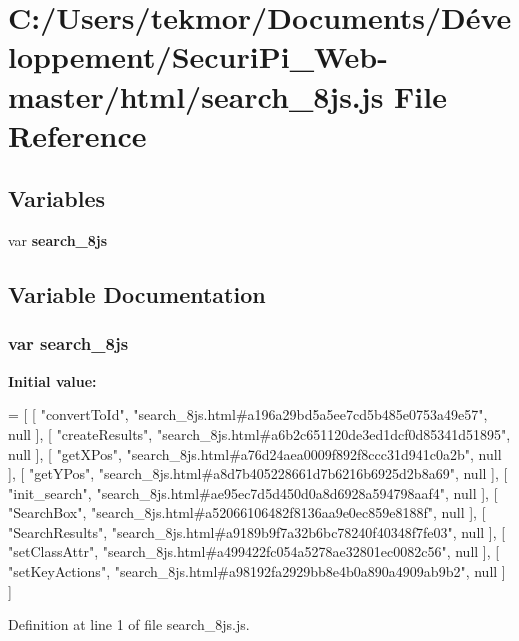 \section{C\+:/\+Users/tekmor/\+Documents/\+Développement/\+Securi\+Pi\+\_\+\+Web-\/master/html/search\+\_\+8js.js File Reference}
\label{search__8js_8js}
\subsection*{Variables}
\begin{DoxyCompactItemize}
\item 
var {\bf search\+\_\+8js}
\end{DoxyCompactItemize}


\subsection{Variable Documentation}
\subsubsection[{search\+\_\+8js}]{\setlength{\rightskip}{0pt plus 5cm}var search\+\_\+8js}\label{search__8js_8js_a768d43704726645088adec5847ceee70}
{\bfseries Initial value\+:}
\begin{DoxyCode}
=
[
    [ \textcolor{stringliteral}{"convertToId"}, \textcolor{stringliteral}{"search\_8js.html#a196a29bd5a5ee7cd5b485e0753a49e57"}, null ],
    [ \textcolor{stringliteral}{"createResults"}, \textcolor{stringliteral}{"search\_8js.html#a6b2c651120de3ed1dcf0d85341d51895"}, null ],
    [ \textcolor{stringliteral}{"getXPos"}, \textcolor{stringliteral}{"search\_8js.html#a76d24aea0009f892f8ccc31d941c0a2b"}, null ],
    [ \textcolor{stringliteral}{"getYPos"}, \textcolor{stringliteral}{"search\_8js.html#a8d7b405228661d7b6216b6925d2b8a69"}, null ],
    [ \textcolor{stringliteral}{"init\_search"}, \textcolor{stringliteral}{"search\_8js.html#ae95ec7d5d450d0a8d6928a594798aaf4"}, null ],
    [ \textcolor{stringliteral}{"SearchBox"}, \textcolor{stringliteral}{"search\_8js.html#a52066106482f8136aa9e0ec859e8188f"}, null ],
    [ \textcolor{stringliteral}{"SearchResults"}, \textcolor{stringliteral}{"search\_8js.html#a9189b9f7a32b6bc78240f40348f7fe03"}, null ],
    [ \textcolor{stringliteral}{"setClassAttr"}, \textcolor{stringliteral}{"search\_8js.html#a499422fc054a5278ae32801ec0082c56"}, null ],
    [ \textcolor{stringliteral}{"setKeyActions"}, \textcolor{stringliteral}{"search\_8js.html#a98192fa2929bb8e4b0a890a4909ab9b2"}, null ]
]
\end{DoxyCode}


Definition at line 1 of file search\+\_\+8js.\+js.

